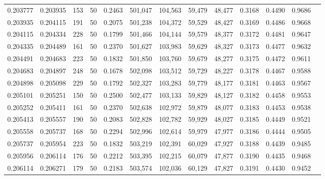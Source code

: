 \begin{tabular}{rrrrrrrrrrrrr}
0.203777 & 0.203935 &   153 &  50 &                                     0.2463 & 501,047 & 104,563 &  59,479 &  48,477 & 0.3168 & 0.4490 & 0.9686 \\
0.203935 & 0.204115 &   191 &  50 &                                     0.2075 & 501,238 & 104,372 &  59,529 &  48,427 & 0.3169 & 0.4486 & 0.9668 \\
0.204115 & 0.204334 &   228 &  50 &                                     0.1799 & 501,466 & 104,144 &  59,579 &  48,377 & 0.3172 & 0.4481 & 0.9647 \\
0.204335 & 0.204489 &   161 &  50 &                                     0.2370 & 501,627 & 103,983 &  59,629 &  48,327 & 0.3173 & 0.4477 & 0.9632 \\
0.204491 & 0.204683 &   223 &  50 &                                     0.1832 & 501,850 & 103,760 &  59,679 &  48,277 & 0.3175 & 0.4472 & 0.9611 \\
0.204683 & 0.204897 &   248 &  50 &                                     0.1678 & 502,098 & 103,512 &  59,729 &  48,227 & 0.3178 & 0.4467 & 0.9588 \\
0.204898 & 0.205098 &   229 &  50 &                                     0.1792 & 502,327 & 103,283 &  59,779 &  48,177 & 0.3181 & 0.4463 & 0.9567 \\
0.205101 & 0.205251 &   150 &  50 &                                     0.2500 & 502,477 & 103,133 &  59,829 &  48,127 & 0.3182 & 0.4458 & 0.9553 \\
0.205252 & 0.205411 &   161 &  50 &                                     0.2370 & 502,638 & 102,972 &  59,879 &  48,077 & 0.3183 & 0.4453 & 0.9538 \\
0.205413 & 0.205557 &   190 &  50 &                                     0.2083 & 502,828 & 102,782 &  59,929 &  48,027 & 0.3185 & 0.4449 & 0.9521 \\
0.205558 & 0.205737 &   168 &  50 &                                     0.2294 & 502,996 & 102,614 &  59,979 &  47,977 & 0.3186 & 0.4444 & 0.9505 \\
0.205737 & 0.205954 &   223 &  50 &                                     0.1832 & 503,219 & 102,391 &  60,029 &  47,927 & 0.3188 & 0.4439 & 0.9485 \\
0.205956 & 0.206114 &   176 &  50 &                                     0.2212 & 503,395 & 102,215 &  60,079 &  47,877 & 0.3190 & 0.4435 & 0.9468 \\
0.206114 & 0.206271 &   179 &  50 &                                     0.2183 & 503,574 & 102,036 &  60,129 &  47,827 & 0.3191 & 0.4430 & 0.9452 \\

\end{tabular}
